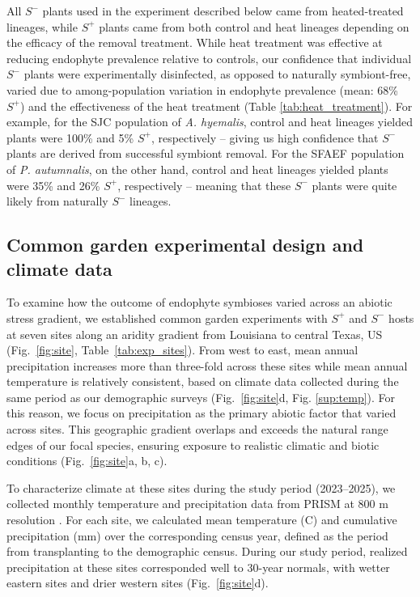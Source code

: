 \documentclass[12pt]{article}\usepackage[]{graphicx}\usepackage[dvipsnames]{xcolor}
\begin{document}
All $S^-$ plants used in the experiment described below came from heated-treated  lineages, while $S^+$ plants came from both control and heat lineages depending on the efficacy of the removal treatment. 
While heat treatment was effective at reducing endophyte prevalence relative to controls, our confidence that individual $S^-$ plants were experimentally disinfected, as opposed to naturally symbiont-free, varied due to among-population variation in endophyte prevalence (mean: 68\% $S^+$) and the effectiveness of the heat treatment (Table \ref{tab:heat_treatment}). 
For example, for the SJC population of \emph{A. hyemalis}, control and heat lineages yielded plants were 100\% and 5\% $S^+$, respectively -- giving us high confidence that $S^-$ plants are derived from successful symbiont removal. 
For the SFAEF population of \emph{P. autumnalis}, on the other hand, control and heat lineages yielded plants were 35\% and 26\% $S^+$, respectively -- meaning that these $S^-$ plants were quite likely from naturally $S^-$ lineages.

\subsection*{Common garden experimental design and climate data}
To examine how the outcome of endophyte symbioses varied across an abiotic stress gradient, we established common garden experiments with $S^+$ and $S^-$ hosts at seven sites along an aridity gradient from Louisiana to central Texas, US (Fig.~\ref{fig:site}, Table~\ref{tab:exp_sites}).
From west to east, mean annual precipitation increases more than three-fold across these sites while mean annual temperature is relatively consistent, based on climate data collected during the same period as our demographic surveys (Fig.~\ref{fig:site}d, Fig. \ref{sup:temp}).
For this reason, we focus on precipitation as the primary abiotic factor that varied across sites.  
This geographic gradient overlaps and exceeds the natural range edges of our focal species, ensuring exposure to realistic climatic and biotic conditions (Fig.~\ref{fig:site}a, b, c). 

To characterize climate at these sites during the study period (2023–2025), we collected monthly temperature and precipitation data from PRISM at 800 m resolution \citep{PRISM2024}. 
For each site, we calculated mean temperature (\textdegree C) and cumulative precipitation (mm) over the corresponding census year, defined as the period from transplanting to the demographic census.
During our study period, realized precipitation at these sites corresponded well to 30-year normals, with wetter eastern sites and drier western sites (Fig.~\ref{fig:site}d). 
\end{document}
